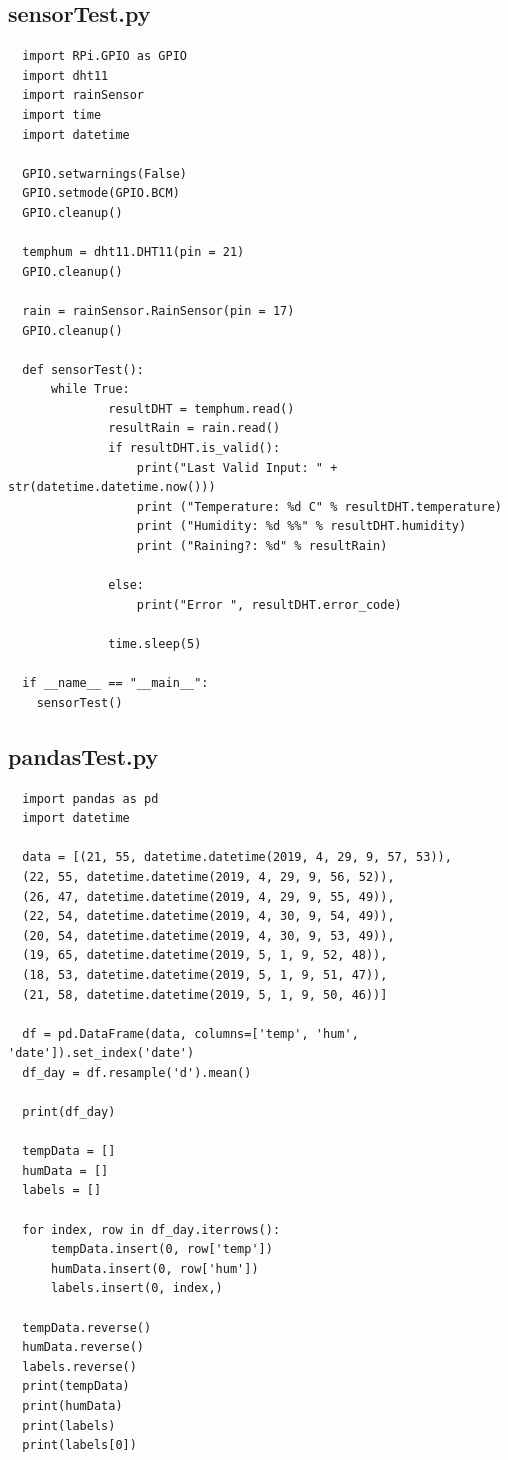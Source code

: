 \documentclass[10pt,a4paper]{article}
\begin{document}
\subsection{sensorTest.py}
\begin{verbatim}
  import RPi.GPIO as GPIO
  import dht11
  import rainSensor
  import time
  import datetime

  GPIO.setwarnings(False)
  GPIO.setmode(GPIO.BCM)
  GPIO.cleanup()

  temphum = dht11.DHT11(pin = 21)
  GPIO.cleanup()

  rain = rainSensor.RainSensor(pin = 17)
  GPIO.cleanup()

  def sensorTest():
      while True:
              resultDHT = temphum.read()
              resultRain = rain.read()
              if resultDHT.is_valid():
                  print("Last Valid Input: " + str(datetime.datetime.now()))
                  print ("Temperature: %d C" % resultDHT.temperature)
                  print ("Humidity: %d %%" % resultDHT.humidity)
                  print ("Raining?: %d" % resultRain)

              else:
                  print("Error ", resultDHT.error_code)
              
              time.sleep(5)
                  
  if __name__ == "__main__":
    sensorTest()
\end{verbatim}

\subsection{pandasTest.py}
\begin{verbatim}
  import pandas as pd
  import datetime

  data = [(21, 55, datetime.datetime(2019, 4, 29, 9, 57, 53)), 
  (22, 55, datetime.datetime(2019, 4, 29, 9, 56, 52)), 
  (26, 47, datetime.datetime(2019, 4, 29, 9, 55, 49)), 
  (22, 54, datetime.datetime(2019, 4, 30, 9, 54, 49)), 
  (20, 54, datetime.datetime(2019, 4, 30, 9, 53, 49)), 
  (19, 65, datetime.datetime(2019, 5, 1, 9, 52, 48)), 
  (18, 53, datetime.datetime(2019, 5, 1, 9, 51, 47)), 
  (21, 58, datetime.datetime(2019, 5, 1, 9, 50, 46))]

  df = pd.DataFrame(data, columns=['temp', 'hum', 'date']).set_index('date')
  df_day = df.resample('d').mean()

  print(df_day)

  tempData = []
  humData = []
  labels = []

  for index, row in df_day.iterrows():
      tempData.insert(0, row['temp'])
      humData.insert(0, row['hum'])
      labels.insert(0, index,)

  tempData.reverse()
  humData.reverse()
  labels.reverse()
  print(tempData)
  print(humData)
  print(labels)
  print(labels[0])
\end{verbatim}

\pagebreak


\end{document}
